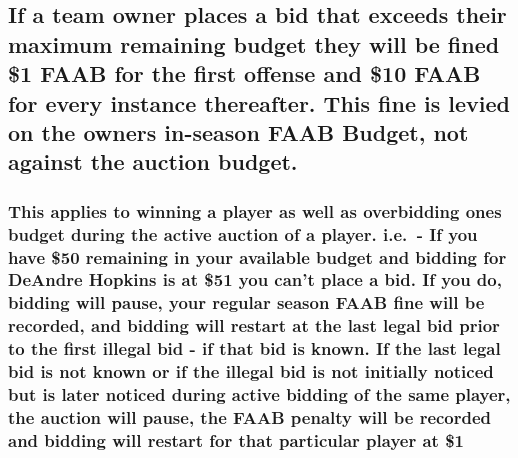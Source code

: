 \documentclass[
]{book}
\begin{document}
\hypertarget{if-a-team-owner-places-a-bid-that-exceeds-their-maximum-remaining-budget-they-will-be-fined-1-faab-for-the-first-offense-and-10-faab-for-every-instance-thereafter.-this-fine-is-levied-on-the-owners-in-season-faab-budget-not-against-the-auction-budget.}{%
\subsection{If a team owner places a bid that exceeds their maximum remaining budget they will be fined \$1 FAAB for the first offense and \$10 FAAB for every instance thereafter. This fine is levied on the owners in-season FAAB Budget, not against the auction budget.}\label{if-a-team-owner-places-a-bid-that-exceeds-their-maximum-remaining-budget-they-will-be-fined-1-faab-for-the-first-offense-and-10-faab-for-every-instance-thereafter.-this-fine-is-levied-on-the-owners-in-season-faab-budget-not-against-the-auction-budget.}}

\hypertarget{this-applies-to-winning-a-player-as-well-as-overbidding-ones-budget-during-the-active-auction-of-a-player.-i.e.---if-you-have-50-remaining-in-your-available-budget-and-bidding-for-deandre-hopkins-is-at-51-you-cant-place-a-bid.-if-you-do-bidding-will-pause-your-regular-season-faab-fine-will-be-recorded-and-bidding-will-restart-at-the-last-legal-bid-prior-to-the-first-illegal-bid---if-that-bid-is-known.-if-the-last-legal-bid-is-not-known-or-if-the-illegal-bid-is-not-initially-noticed-but-is-later-noticed-during-active-bidding-of-the-same-player-the-auction-will-pause-the-faab-penalty-will-be-recorded-and-bidding-will-restart-for-that-particular-player-at-1}{%
\subsubsection{This applies to winning a player as well as overbidding ones budget during the active auction of a player. i.e.~- If you have \$50 remaining in your available budget and bidding for DeAndre Hopkins is at \$51 you can't place a bid. If you do, bidding will pause, your regular season FAAB fine will be recorded, and bidding will restart at the last legal bid prior to the first illegal bid - if that bid is known. If the last legal bid is not known or if the illegal bid is not initially noticed but is later noticed during active bidding of the same player, the auction will pause, the FAAB penalty will be recorded and bidding will restart for that particular player at \$1}\label{this-applies-to-winning-a-player-as-well-as-overbidding-ones-budget-during-the-active-auction-of-a-player.-i.e.---if-you-have-50-remaining-in-your-available-budget-and-bidding-for-deandre-hopkins-is-at-51-you-cant-place-a-bid.-if-you-do-bidding-will-pause-your-regular-season-faab-fine-will-be-recorded-and-bidding-will-restart-at-the-last-legal-bid-prior-to-the-first-illegal-bid---if-that-bid-is-known.-if-the-last-legal-bid-is-not-known-or-if-the-illegal-bid-is-not-initially-noticed-but-is-later-noticed-during-active-bidding-of-the-same-player-the-auction-will-pause-the-faab-penalty-will-be-recorded-and-bidding-will-restart-for-that-particular-player-at-1}}
\end{document}
